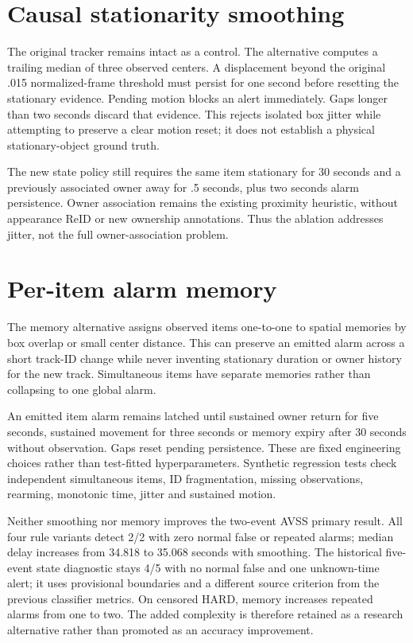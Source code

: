 \section{Causal stationarity smoothing}
The original tracker remains intact as a control. The alternative computes a trailing median of three observed centers. A displacement beyond the original .015 normalized-frame threshold must persist for one second before resetting the stationary evidence. Pending motion blocks an alert immediately. Gaps longer than two seconds discard that evidence. This rejects isolated box jitter while attempting to preserve a clear motion reset; it does not establish a physical stationary-object ground truth.

The new state policy still requires the same item stationary for 30 seconds and a previously associated owner away for .5 seconds, plus two seconds alarm persistence. Owner association remains the existing proximity heuristic, without appearance ReID or new ownership annotations. Thus the ablation addresses jitter, not the full owner-association problem.

\section{Per-item alarm memory}
The memory alternative assigns observed items one-to-one to spatial memories by box overlap or small center distance. This can preserve an emitted alarm across a short track-ID change while never inventing stationary duration or owner history for the new track. Simultaneous items have separate memories rather than collapsing to one global alarm.

An emitted item alarm remains latched until sustained owner return for five seconds, sustained movement for three seconds or memory expiry after 30 seconds without observation. Gaps reset pending persistence. These are fixed engineering choices rather than test-fitted hyperparameters. Synthetic regression tests check independent simultaneous items, ID fragmentation, missing observations, rearming, monotonic time, jitter and sustained motion.

Neither smoothing nor memory improves the two-event AVSS primary result. All four rule variants detect 2/2 with zero normal false or repeated alarms; median delay increases from 34.818 to 35.068 seconds with smoothing. The historical five-event state diagnostic stays 4/5 with no normal false and one unknown-time alert; it uses provisional boundaries and a different source criterion from the previous classifier metrics. On censored HARD, memory increases repeated alarms from one to two. The added complexity is therefore retained as a research alternative rather than promoted as an accuracy improvement.


